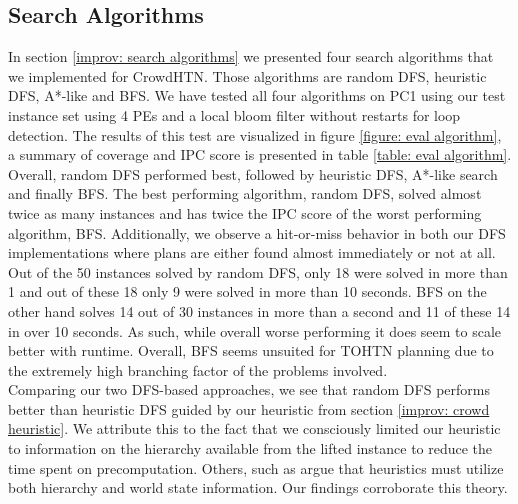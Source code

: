 \subsection{Search Algorithms}
\label{eval: algorithms}
In section \ref{improv: search algorithms} we presented four search algorithms that we implemented for CrowdHTN. Those algorithms are random DFS, heuristic DFS, A*-like and BFS. We have tested all four algorithms on PC1 using our test instance set using 4 PEs and a local bloom filter without restarts for loop detection. The results of this test are visualized in figure \ref{figure: eval algorithm}, a summary of coverage and IPC score is presented in table \ref{table: eval algorithm}. \\
Overall, random DFS performed best, followed by heuristic DFS, A*-like search and finally BFS. The best performing algorithm, random DFS, solved almost twice as many instances and has twice the IPC score of the worst performing algorithm, BFS. Additionally, we observe a hit-or-miss behavior in both our DFS implementations where plans are either found almost immediately or not at all. Out of the 50 instances solved by random DFS, only 18 were solved in more than 1 and out of these 18 only 9 were solved in more than 10 seconds. BFS on the other hand solves 14 out of 30 instances in more than a second and 11 of these 14 in over 10 seconds. As such, while overall worse performing it does seem to scale better with runtime. Overall, BFS seems unsuited for TOHTN planning due to the extremely high branching factor of the problems involved.
\\
Comparing our two DFS-based approaches, we see that random DFS performs better than heuristic DFS guided by our heuristic from section \ref{improv: crowd heuristic}. We attribute this to the fact that we consciously limited our heuristic to information on the hierarchy available from the lifted instance to reduce the time spent on precomputation. Others, such as \cite{holler2020htn} argue that heuristics must utilize both hierarchy and world state information. Our findings corroborate this theory.

